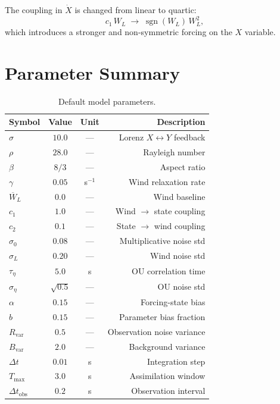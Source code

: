 \documentclass[11pt,a4paper]{article}
\begin{document}
The coupling in $\dot X$ is changed from linear to quartic:
\[
c_1\,W_L \;\longrightarrow\; \operatorname{sgn}(W_L)\,W_L^2,
\]
which introduces a stronger and non-symmetric forcing on the $X$ variable.

\section{Parameter Summary}

\begin{table}[ht]
\centering
\caption{Default model parameters.}
\begin{tabular}{lccr}
\toprule
Symbol & Value & Unit & Description\\
\midrule
$\sigma$ & $10.0$ & — & Lorenz $X\leftrightarrow Y$ feedback\\
$\rho$ & $28.0$ & — & Rayleigh number\\
$\beta$ & $8/3$ & — & Aspect ratio\\
$\gamma$ & $0.05$ & s$^{-1}$ & Wind relaxation rate\\
$\overline W_L$ & $0.0$ & — & Wind baseline\\
$c_1$ & $1.0$ & — & Wind $\to$ state coupling\\
$c_2$ & $0.1$ & — & State $\to$ wind coupling\\
$\sigma_0$ & $0.08$ & — & Multiplicative noise std\\
$\sigma_L$ & $0.20$ & — & Wind noise std\\
$\tau_\eta$ & $5.0$ & s & OU correlation time\\
$\sigma_\eta$ & $\sqrt{0.5}$ & — & OU noise std\\
$\alpha$ & $0.15$ & — & Forcing-state bias\\
$b$ & $0.15$ & — & Parameter bias fraction\\
$R_{\text{var}}$ & $0.5$ & — & Observation noise variance\\
$B_{\text{var}}$ & $2.0$ & — & Background variance\\
$\Delta t$ & $0.01$ & s & Integration step\\
$T_{\max}$ & $3.0$ & s & Assimilation window\\
$\Delta t_{\text{obs}}$ & $0.2$ & s & Observation interval\\
\bottomrule
\end{tabular}
\end{table}
\end{document}
